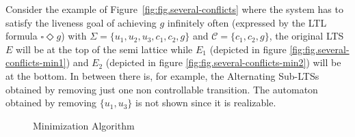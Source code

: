 Consider the example of Figure~\ref{fig:fig.several-conflicts} where the system has to satisfy the liveness goal of
achieving $g$ infinitely often (expressed
by the LTL formula $\square \Diamond g$)
with $\Sigma = \{u_1, u_2, u_3, c_1, c_2, g\}$ and 
$\mathcal{C} = \{c_1, c_2, g\}$, the original LTS $E$ will be
at the top of the semi lattice while $E_1$ (depicted in figure \ref{fig:fig.several-conflicts-min1}) and $E_2$ (depicted in 
figure \ref{fig:fig.several-conflicts-min2}) will be at 
the bottom.  In between there is, for example, the Alternating Sub-LTSs
obtained by removing just one non controllable transition.  
The automaton obtained by removing $\{u_1, u_3\}$ is not shown
since it is realizable. 

\begin{figure}[ht]
	\begin{center}
		 
		\caption{Minimization Algorithm}
		\label{fig:dfs-code}
	\end{center}
\end{figure}

